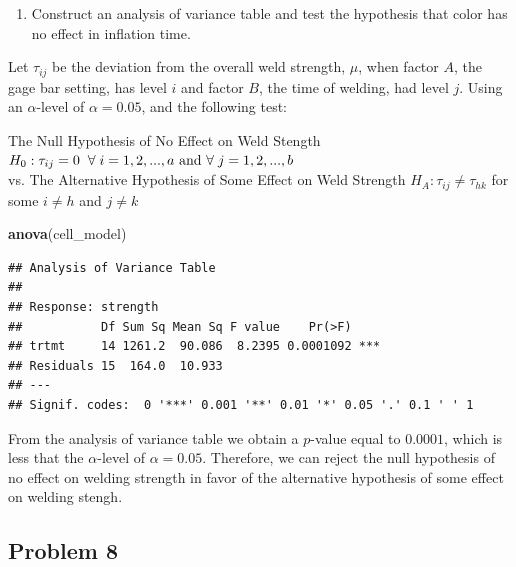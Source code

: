 \documentclass[12pt,]{article}
\newenvironment{Shaded}{\begin{snugshade}}{\end{snugshade}}
\newcommand{\KeywordTok}[1]{\textcolor[rgb]{0.13,0.29,0.53}{\textbf{#1}}}
\newcommand{\NormalTok}[1]{#1}
\providecommand{\tightlist}{%
  \setlength{\itemsep}{0pt}\setlength{\parskip}{0pt}}
\begin{document}
\begin{enumerate}
\def\labelenumi{(\alph{enumi})}
\setcounter{enumi}{2}
\tightlist
\item
  Construct an analysis of variance table and test the hypothesis that
  color has no effect in inflation time.
\end{enumerate}

Let \(\tau_{ij}\) be the deviation from the overall weld strength,
\(\mu\), when factor \(A\), the gage bar setting, has level \(i\) and
factor \(B\), the time of welding, had level \(j\). Using an
\(\alpha\)-level of \(\alpha = 0.05\), and the following test:

\begin{center}
 The Null Hypothesis of No Effect on Weld Stength  
 $H_0 : \tau_{ij} = 0 \hspace{.2cm }\forall \hspace{.1cm} i=1,2,...,a \text{ and }\forall  \hspace{.1cm} j=1,2,...,b$ \\
 vs. The Alternative Hypothesis of Some Effect on Weld Strength $H_A : \tau_{ij} \neq \tau_{hk}$ for some $i\neq h$ and $j\neq k$ 
\end{center}

\begin{Shaded}
\begin{Highlighting}[]
\KeywordTok{anova}\NormalTok{(cell_model)}
\end{Highlighting}
\end{Shaded}

\begin{verbatim}
## Analysis of Variance Table
## 
## Response: strength
##           Df Sum Sq Mean Sq F value    Pr(>F)    
## trtmt     14 1261.2  90.086  8.2395 0.0001092 ***
## Residuals 15  164.0  10.933                      
## ---
## Signif. codes:  0 '***' 0.001 '**' 0.01 '*' 0.05 '.' 0.1 ' ' 1
\end{verbatim}

From the analysis of variance table we obtain a \(p\)-value equal to
\(0.0001\), which is less that the \(\alpha\)-level of
\(\alpha = 0.05\). Therefore, we can reject the null hypothesis of no
effect on welding strength in favor of the alternative hypothesis of
some effect on welding stengh.

\subsection{Problem 8}\label{problem-8}
\end{document}
